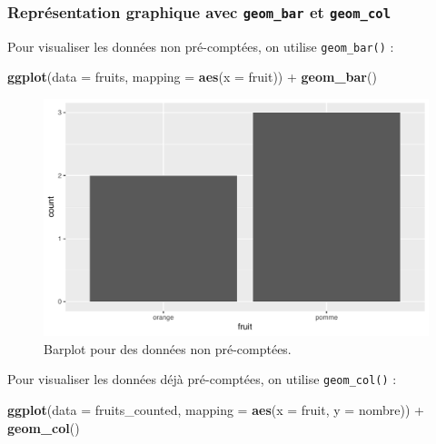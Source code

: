 \documentclass[a4paperpaper,]{article}
\newenvironment{Shaded}{\begin{snugshade}}{\end{snugshade}}
\newcommand{\DataTypeTok}[1]{\textcolor[rgb]{0.00,0.34,0.68}{#1}}
\newcommand{\KeywordTok}[1]{\textcolor[rgb]{0.12,0.11,0.11}{\textbf{#1}}}
\newcommand{\NormalTok}[1]{\textcolor[rgb]{0.12,0.11,0.11}{#1}}
\newcommand{\OperatorTok}[1]{\textcolor[rgb]{0.12,0.11,0.11}{#1}}
\newcommand{\StringTok}[1]{\textcolor[rgb]{0.75,0.01,0.01}{#1}}
\theoremstyle{definition}
\theoremstyle{definition}
\theoremstyle{definition}
\theoremstyle{remark}
\begin{document}
\hypertarget{representation-graphique-avec-geom_bar-et-geom_col}{%
\subsubsection{\texorpdfstring{Représentation graphique avec
\texttt{geom\_bar} et
\texttt{geom\_col}}{Représentation graphique avec geom\_bar et geom\_col}}\label{representation-graphique-avec-geom_bar-et-geom_col}}

Pour visualiser les données non pré-comptées, on utilise
\texttt{geom\_bar()} :

\begin{Shaded}
\begin{Highlighting}[]
\KeywordTok{ggplot}\NormalTok{(}\DataTypeTok{data =}\NormalTok{ fruits, }\DataTypeTok{mapping =} \KeywordTok{aes}\NormalTok{(}\DataTypeTok{x =}\NormalTok{ fruit)) }\OperatorTok{+}
\StringTok{  }\KeywordTok{geom_bar}\NormalTok{()}
\end{Highlighting}
\end{Shaded}

\begin{figure}[htpb]

{\centering \includegraphics[width=0.9\linewidth]{figure/barplot-1} 

}

\caption{Barplot pour des données non pré-comptées.}\label{fig:barplot}
\end{figure}

Pour visualiser les données déjà pré-comptées, on utilise
\texttt{geom\_col()} :

\begin{Shaded}
\begin{Highlighting}[]
\KeywordTok{ggplot}\NormalTok{(}\DataTypeTok{data =}\NormalTok{ fruits_counted, }\DataTypeTok{mapping =} \KeywordTok{aes}\NormalTok{(}\DataTypeTok{x =}\NormalTok{ fruit, }\DataTypeTok{y =}\NormalTok{ nombre)) }\OperatorTok{+}
\StringTok{  }\KeywordTok{geom_col}\NormalTok{()}
\end{Highlighting}
\end{Shaded}
\end{document}

